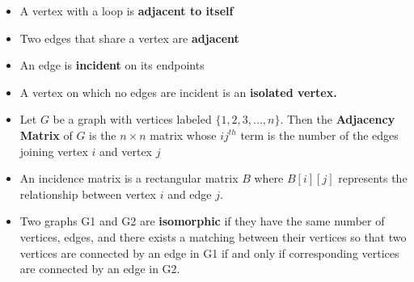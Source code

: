 \documentclass{report}
\begin{document}
\begin{itemize}
      \item A vertex with a loop is \textbf{adjacent to itself}
      \item  Two edges that share a vertex are \textbf{adjacent}
      \item An edge is \textbf{incident} on its endpoints
      \item A vertex on which no edges are incident is an \textbf{isolated vertex.}
      \item Let $G $ be a graph with vertices labeled $\{1,2,3,...,n\} $. Then the \textbf{Adjacency Matrix} of $G$ is the $n \times n$ matrix whose $ij^{th}$ term is the number of the edges joining vertex $i $ and vertex $j $
      \item An incidence matrix is a rectangular matrix \( B \) where \( B[i][j] \) represents the relationship between vertex \( i \) and edge \( j \).
      \item Two graphs G1 and G2 are \textbf{isomorphic} if they have the same number of vertices, edges, and there exists a matching between their vertices so that two vertices are connected by an edge in G1 if and only if corresponding vertices are connected by an edge in G2.

      \end{itemize}

      \pagebreak \bigbreak \noindent 
\end{document}
